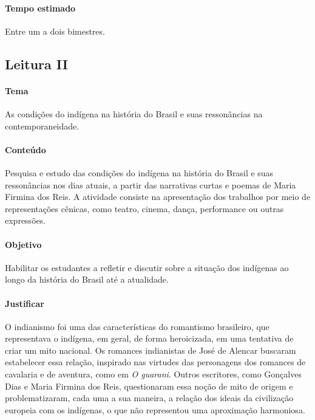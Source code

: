 \documentclass[12pt]{extarticle}
\begin{document}
\paragraph{Tempo estimado} Entre um a dois bimestres.

\subsection{Leitura II}

\paragraph{Tema} As condições do indígena na história do Brasil e suas
  ressonâncias na contemporaneidade.


\paragraph{Conteúdo} Pesquisa e estudo das condições do indígena na
história do Brasil e suas ressonâncias nos dias atuais, a partir das
narrativas curtas e poemas de Maria Firmina dos Reis. A atividade
consiste na apresentação dos trabalhos por meio de representações
cênicas, como teatro, cinema, dança, performance ou outras expressões.

\paragraph{Objetivo} Habilitar os estudantes a refletir e discutir sobre a
situação dos indígenas ao longo da história do Brasil até a atualidade.

\paragraph{Justificar} O indianismo foi uma das características do
romantismo brasileiro, que representava o indígena, em geral, de forma
heroicizada, em uma tentativa de criar um mito nacional. Os romances
indianistas de José de Alencar buscaram estabelecer essa relação,
inspirado nas virtudes das personagens dos romances de cavalaria e de
aventura, como em \emph{O guarani}. Outros escritores, como Gonçalves
Dias e Maria Firmina dos Reis, questionaram essa noção de mito de origem
e problematizaram, cada uma a sua maneira, a relação dos ideais da
civilização europeia com os indígenas, o que não representou uma
aproximação harmoniosa.
\end{document}
